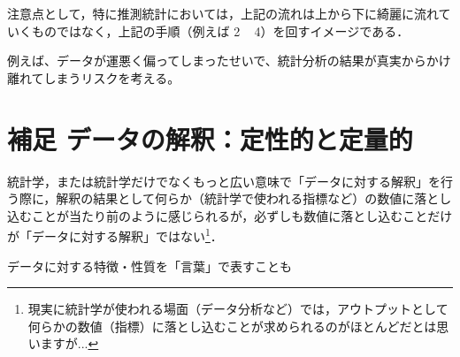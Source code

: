 注意点として，特に推測統計においては，上記の流れは上から下に綺麗に流れていくものではなく，上記の手順（例えば 2 ~ 4）を回すイメージである．

例えば、データが運悪く偏ってしまったせいで、統計分析の結果が真実からかけ離れてしまうリスクを考える。

\section{補足 データの解釈：定性的と定量的}

統計学，または統計学だけでなくもっと広い意味で「データに対する解釈」を行う際に，解釈の結果として何らか（統計学で使われる指標など）の数値に落とし込むことが当たり前のように感じられるが，必ずしも数値に落とし込むことだけが「データに対する解釈」ではない\footnote{現実に統計学が使われる場面（データ分析など）では，アウトプットとして何らかの数値（指標）に落とし込むことが求められるのがほとんどだとは思いますが...}．

データに対する特徴・性質を「言葉」で表すことも
